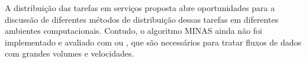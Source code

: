 
A distribuição das tarefas em serviços proposta abre oportunidades para a
discussão de diferentes métodos de distribuição dessas tarefas em diferentes
ambientes computacionais.
Contudo, o algoritmo MINAS ainda não foi implementado e avaliado com
 ou , que são
necessários para tratar fluxos de dados com grandes volumes e velocidades.




